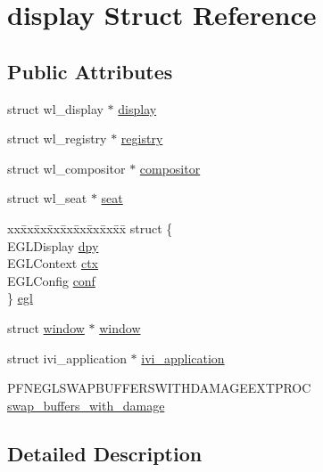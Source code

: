 \hypertarget{structdisplay}{}\section{display Struct Reference}
\label{structdisplay}
\subsection*{Public Attributes}
\begin{DoxyCompactItemize}
\item 
struct wl\+\_\+display $\ast$ \hyperlink{structdisplay_aa8faf09631925e9221fd8a0c086ce75a}{display}
\item 
struct wl\+\_\+registry $\ast$ \hyperlink{structdisplay_a925781323f5c8eb84ef2225ed129de4b}{registry}
\item 
struct wl\+\_\+compositor $\ast$ \hyperlink{structdisplay_a41ba32dfde812165dda5b62885000c78}{compositor}
\item 
struct wl\+\_\+seat $\ast$ \hyperlink{structdisplay_a9dd8fd9967beb6b3767bd93011373bb8}{seat}
\item 
\begin{tabbing}
xx\=xx\=xx\=xx\=xx\=xx\=xx\=xx\=xx\=\kill
struct \{\\
\>EGLDisplay \hyperlink{structdisplay_a8a1cbda15a286e41e89a85f158ce9311}{dpy}\\
\>EGLContext \hyperlink{structdisplay_a3420940a29a710e0e5ebd41ba462cc00}{ctx}\\
\>EGLConfig \hyperlink{structdisplay_a880aef9408b499f5b749541dc6e396c3}{conf}\\
\} \hyperlink{structdisplay_a8b8bc104c19ff228d476a377e572d9c7}{egl}\\

\end{tabbing}\item 
struct \hyperlink{structwindow}{window} $\ast$ \hyperlink{structdisplay_a9974d560bec291487ae2440f897ffc58}{window}
\item 
struct ivi\+\_\+application $\ast$ \hyperlink{structdisplay_a24c073faff3bb4799c2d46291f27ab89}{ivi\+\_\+application}
\item 
P\+F\+N\+E\+G\+L\+S\+W\+A\+P\+B\+U\+F\+F\+E\+R\+S\+W\+I\+T\+H\+D\+A\+M\+A\+G\+E\+E\+X\+T\+P\+R\+OC \hyperlink{structdisplay_a48c46c118e4765ef06596f6341c8f23f}{swap\+\_\+buffers\+\_\+with\+\_\+damage}
\end{DoxyCompactItemize}


\subsection{Detailed Description}


